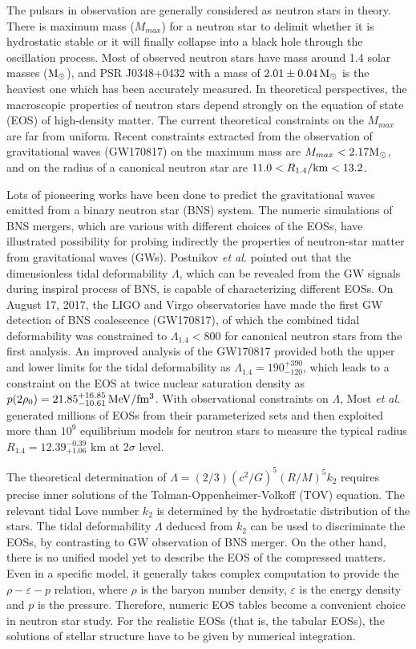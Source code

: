 \documentclass[preprint,tightenlines,eqsecnum,floats,aps,amsmath,amssymb,nofootinbib,prd,showpacs]{revtex4}
\begin{document}
The pulsars in observation are generally considered as neutron stars in theory. There is maximum mass ($M_{max}$) for a neutron star to delimit whether it is hydrostatic stable or it will finally collapse into a black hole through the oscillation process. Most of observed neutron stars have mass around 1.4 solar masses ($\rm{M}_{\odot}$), and PSR J0348+0432 with a mass of $2.01 \pm 0.04 \, \rm{M}_{\odot}$ is the heaviest one which has been accurately measured. In theoretical perspectives, the macroscopic properties of neutron stars depend strongly on the equation of state (EOS) of high-density matter. The current theoretical constraints on the $M_{max}$ are far from uniform. Recent constraints extracted from the observation of gravitational waves (GW170817) on the  maximum mass are $M_{max} < 2.17\rm{M}_{\odot}$, and on the radius of a canonical neutron star are $11.0 < R_{1.4}/ \rm{km} < 13.2$.

Lots of pioneering works have been done to predict the gravitational waves emitted from a binary neutron star (BNS) system. The numeric simulations of BNS mergers, which are various with different choices of the EOSs, have illustrated possibility for probing indirectly the properties of neutron-star matter from gravitational waves (GWs). Postnikov \emph{et al.} pointed out that the dimensionless tidal deformability $\Lambda$, which can be revealed from the GW signals during inspiral process of BNS, is capable of characterizing different EOSs. On August 17, 2017, the LIGO and Virgo observatories have made the first GW detection of BNS coalescence (GW170817), of which the combined tidal deformability was constrained to $\Lambda_{1.4}  < 800$ for canonical neutron stars from the first analysis. An improved analysis of the GW170817 provided both the upper and lower limits for the tidal deformability as ${\Lambda _{1.4}} = 190_{ - 120}^{ + 390}$, which leads to a constraint on the EOS at twice nuclear saturation density as $p(2{\rho _0}) = 21.85_{ - 10.61}^{ + 16.85} \, \rm{MeV/fm^3}$. With observational constraints on $\Lambda$, Most \emph{et al.} generated millions of EOSs from their parameterized sets and then exploited more than $10^{9}$ equilibrium models for neutron stars to measure the typical radius ${R_{1.4}} = 12.39_{ + 1.06}^{ - 0.39}$ $\textrm{km}$ at $2\sigma $ level.


The theoretical determination of $\Lambda  = (2/3){({c^2}/G)^5}{(R/M)^5}{k_2}$ requires precise inner solutions of the Tolman-Oppenheimer-Volkoff (TOV) equation. The relevant tidal Love number $k_2$ is determined by the hydrostatic distribution of the stars. The tidal deformability $\Lambda$ deduced from $k_2$ can be used to discriminate the EOSs, by contrasting to GW observation of BNS merger.
On the other hand, there is no unified model yet to describe the EOS of the compressed matters. Even in a specific model, it generally takes complex computation to provide the $\rho-\varepsilon-p$ relation, where $\rho$ is the baryon number density, $\varepsilon$ is the energy density and $p$ is the pressure. Therefore, numeric EOS tables become a convenient choice in neutron star study. For the realistic EOSs (that is, the tabular EOSs), the solutions of stellar structure have to be given by numerical integration.
\end{document}
